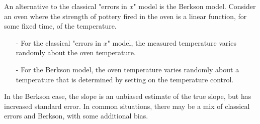 An alternative to the classical "errors in $x$" model is the Berkson
model.  Consider an oven where the strength of pottery fired in the
oven is a linear function, for some fixed time, of the temperature.  

\begin{itemize}
\item [-] For the classical "errors in $x$" model, the measured
temperature varies randomly about the oven temperature.
\item[-] For the Berkson model, the oven temperature varies randomly
about a temperature that is determined by setting on the temperature
control.
\end{itemize}

In the Berkson  case, the slope is an unbiased estimate of the true
slope, but has increased standard error.  In common situations, there
may be a mix of classical errors and Berkson, with some additional
bias.

